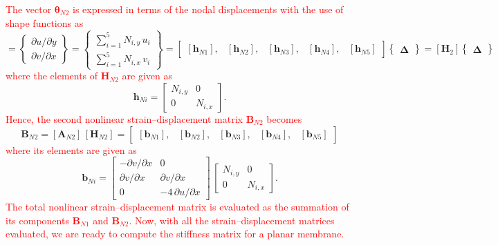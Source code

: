 \textcolor{red}{The vector $\boldsymbol{\theta}_{N2}$ is expressed in terms of the nodal displacements with the use of shape functions as}
\begin{equation}
[\boldsymbol{\theta}_{N2}] =  \begin{Bmatrix}
\partial u / \partial y\\
\partial v / \partial x
\end{Bmatrix}
= \begin{Bmatrix}
\sum\nolimits_{i=1}^5 N_{i,y} \, u_i\\
\sum\nolimits_{i=1}^5 N_{i,x} \, v_i
\end{Bmatrix} 
= \begin{bmatrix}
[\mathbf{h}_{N1}], & [\mathbf{h}_{N2}], & [\mathbf{h}_{N3}], & [\mathbf{h}_{N4}], & [\mathbf{h}_{N5}] 
\end{bmatrix}  \begin{Bmatrix} \boldsymbol{\Delta} \end{Bmatrix}  
= [\mathbf{H}_2] \begin{Bmatrix} \boldsymbol{\Delta} \end{Bmatrix} 
\end{equation}
\textcolor{red}{where the elements of $\mathbf{H}_{N2}$ are given as}
\begin{equation}
\mathbf{h}_{Ni} = \begin{bmatrix}
N_{i,y} &  0  \\
0 & N_{i,x}  \end{bmatrix}. 
\end{equation}
\textcolor{red}{Hence, the second nonlinear strain--displacement matrix $\mathbf{B}_{N2}$ becomes}
\begin{equation}
\mathbf{B}_{N2} = [\mathbf{A}_{N2}] \, [\mathbf{H}_{N2}] = \begin{bmatrix}
[\mathbf{b}_{N1}], & [\mathbf{b}_{N2}], & [\mathbf{b}_{N3}], & [\mathbf{b}_{N4}], & [\mathbf{b}_{N5}] 
\end{bmatrix} 
\end{equation}
\textcolor{red}{where its elements are given as}
\begin{equation}
\mathbf{b}_{Ni} = \begin{bmatrix}
- \partial v / \partial x &  0 \\
\partial v / \partial x &  \partial v / \partial x \\
0 & -4 \, \partial u / \partial x  \end{bmatrix} \, \begin{bmatrix}
N_{i,y} &  0  \\
0 & N_{i,x}  \end{bmatrix}. 
\end{equation}
\textcolor{red}{The total nonlinear strain--displacement matrix is evaluated as the summation of its components $ \mathbf{B}_{N1}$ and $\mathbf{B}_{N2}$. Now, with all the strain--displacement matrices evaluated, we are ready to compute the stiffness matrix for a planar membrane.}

